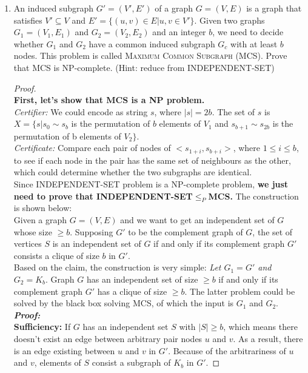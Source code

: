 \documentclass[12pt,a4paper]{article}
\theoremstyle{definition}
\begin{document}
\begin{enumerate}
\begin{proof}
    \end{proof}
    \item An induced subgraph $G'=(V',E')$ of a graph $G=(V,E)$ is a graph that satisfies $V'\subseteq V$ and $E' =\{(u,v)\in E| u,v\in V'\}$. Given two graphs $G_1=(V_1,E_1)$ and $G_2=(V_2,E_2)$ and an integer $b$, we need to decide whether $G_1$ and $G_2$ have a common induced subgraph $G_c$ with at least $b$ nodes. This problem is called \textsc{Maximum Common Subgraph} (MCS). Prove that MCS is NP-complete. (Hint: reduce from \textsc{INDEPENDENT-SET})
	\begin{proof}
	~\\
	\textbf{First, let's show that MCS is a NP problem.} 
	\\
	\textit{Certifier:} We could encode as string $s$, where $|s|=2b$. The set of $s$ is $X=\{s|s_0\sim s_b$ is the permutation of $b$ elements of $V_1$ and $s_{b+1}\sim s_{2b}$ is the permutation of b elements of $V_2\}$. 
	\\
	\textit{Certificate:} Compare each pair of nodes of $<s_{1+i},s_{b+i}>$, where $1\leq i\leq b$, to see if each node in the pair has the same set of neighbours as the other, which could determine whether the two subgraphs are identical.
	\\
	Since \textsc{INDEPENDENT-SET} problem is a NP-complete problem, \textbf{we just need to prove that \textsc{INDEPENDENT-SET}$\leq_P$\textsc{MCS}.} The construction is shown below:
	\\
	Given a graph $G=(V,E)$ and we want to get an independent set of $G$ whose size $\geq b$. Supposing $G'$ to be the complement graph of $G$, the set of vertices $S$ is an independent set of $G$ if and only if its complement graph $G'$ consists a clique of size $b$ in $G'$. 
	\\
	Based on the claim, the construction is very simple: \textit{Let $G_1=G'$ and $G_2=K_b$}. Graph $G$ has an independent set of size $\geq b$ if and only if its complement graph $G'$ has a clique of size $\geq b$. The latter problem could be solved by the black box solving MCS, of which the input is $G_1$ and $G_2$.
	\\
	\textbf{\textit{Proof:}}
	\\ 
	\textbf{Sufficiency:}
	If $G$ has an independent set $S$ with $|S|\geq b$, which means there doesn't exist an edge between arbitrary pair nodes $u$ and $v$. As a result, there is an edge existing between $u$ and $v$ in $G'$. Because of the arbitrariness of $u$ and $v$, elements of $S$ consist a subgraph of $K_b$ in $G'$.

\end{proof}
\end{enumerate}
\end{document}
